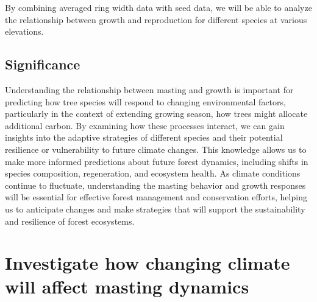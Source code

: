 \documentclass[11pt,letter]{article}
\begin{document}
By combining averaged ring width data with seed data, we will be able to analyze the relationship between growth and reproduction for different species at various elevations.

\subsection{Significance}
Understanding the relationship between masting and growth is important for predicting how tree species will respond to changing environmental factors, particularly in the context of extending growing season, how trees might allocate additional carbon. By examining how these processes interact, we can gain insights into the adaptive strategies of different species and their potential resilience or vulnerability to future climate changes. This knowledge allows us to make more informed predictions about future forest dynamics, including shifts in species composition, regeneration, and ecosystem health. As climate conditions continue to fluctuate, understanding the  masting behavior and growth responses will be essential for effective forest management and conservation efforts, helping us to anticipate changes and make strategies that will support the sustainability and resilience of forest ecosystems.

\section{Investigate how changing climate will affect masting dynamics} %
\end{document}
